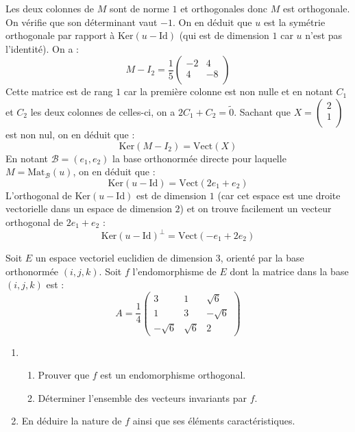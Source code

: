 \documentclass[a4paper,10pt]{report}
\begin{document}
\corr Les deux colonnes de $M$ sont de norme $1$ et orthogonales donc $M$ est orthogonale. On vérifie que son déterminant vaut $-1$. On en déduit que $u$ est la symétrie orthogonale par rapport à $\textrm{Ker}(u- \textrm{Id})$ (qui est de dimension $1$ car $u$ n'est pas l'identité). On a :
$$ M- I_2 = \dfrac{1}{5} \begin{pmatrix}
-2 & 4 \\
4 & -8 \\
\end{pmatrix}$$
Cette matrice est de rang $1$ car la première colonne est non nulle et en notant $C_1$ et $C_2$ les deux colonnes de celles-ci, on a $2C_1+C_2= \tilde{0}$. Sachant que $X=\begin{pmatrix}
2 \\
1 \\
\end{pmatrix}$ est non nul, on en déduit que :
$$ \textrm{Ker}(M-I_2) = \textrm{Vect}(X)$$
En notant $\mathcal{B}=(e_1,e_2)$ la base orthonormée directe pour laquelle $M= \textrm{Mat}_{\mathcal{B}}(u)$, on en déduit que :
$$ \textrm{Ker}(u- \textrm{Id}) = \textrm{Vect}(2e_1+e_2)$$
L'orthogonal de  $\textrm{Ker}(u- \textrm{Id})$ est de dimension $1$ (car cet espace est une droite vectorielle dans un espace de dimension $2$) et on trouve facilement un vecteur orthogonal de $2e_1+e_2$ :
$$  \textrm{Ker}(u- \textrm{Id})^{\perp} =  \textrm{Vect}(-e_1+2e_2)$$




\begin{Exa} Soit $E$ un espace vectoriel euclidien de dimension 3, orienté par la base orthonormée $(i,j,k)$. Soit $f$ l'endomorphisme de $E$ dont la matrice dans la base $(i,j,k)$ est :
$$A=\dfrac{1}{4}\begin{pmatrix}
3&1&\sqrt{6}\\
1&3&-\sqrt{6}\\
-\sqrt{6}&\sqrt{6}&2
\end{pmatrix}$$
\begin{enumerate}
\item
\begin{enumerate}
\item 
Prouver que $f$ est un endomorphisme orthogonal.
\item
Déterminer l'ensemble des vecteurs invariants par $f$.
\end{enumerate}
\item
En déduire la nature de $f$ ainsi que ses éléments caractéristiques.
\end{enumerate}
\end{Exa}
\end{document}
